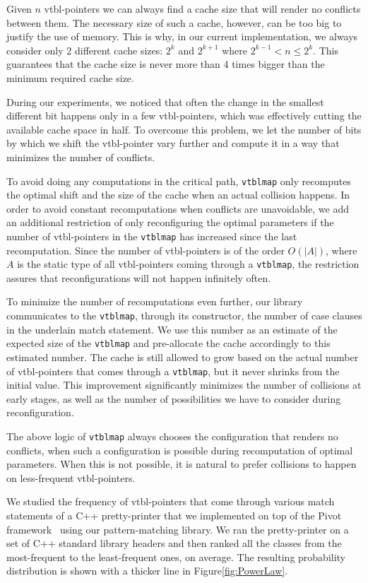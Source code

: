 \documentclass[preprint]{sigplanconf}
\makeatletter
\DeclareRobustCommand{\code}[1]{{\lstinline[breaklines=false,escapechar=@]{#1}}}
\makeatother
\begin{document}
Given $n$ vtbl-pointers we can always find a cache size that will render no 
conflicts between them. The necessary size of such a cache, however, can be too 
big to justify the use of memory. This is why, in our current implementation, we 
always consider only 2 different cache sizes: $2^k$ and $2^{k+1}$ where 
$2^{k-1} < n \leq 2^k$. This guarantees that the cache size is never more than 4 
times bigger than the minimum required cache size.

During our experiments, we noticed that often the change in the smallest 
different bit happens only in a few vtbl-pointers, which was effectively 
cutting the available cache space in half. To overcome this problem, we let the 
number of bits by which we shift the vtbl-pointer vary further and compute it in 
a way that minimizes the number of conflicts.

To avoid doing any computations in the critical path, \code{vtblmap} only 
recomputes the optimal shift and the size of the cache when an actual collision 
happens. In order to avoid constant recomputations when conflicts are unavoidable, 
we add an additional restriction of only reconfiguring the optimal parameters if 
the number of vtbl-pointers in the \code{vtblmap} has increased since the last 
recomputation. Since the number of vtbl-pointers is of the order $O(|A|)$, where 
$A$ is the static type of all vtbl-pointers coming through a \code{vtblmap}, the 
restriction assures that reconfigurations will not happen infinitely often.

To minimize the number of recomputations even further, our library communicates 
to the \code{vtblmap}, through its constructor, the number of case clauses in 
the underlain match statement. We use this number as an estimate of the expected 
size of the \code{vtblmap} and pre-allocate the cache accordingly to this estimated 
number. The cache is still allowed to grow based on the actual number of 
vtbl-pointers that comes through a \code{vtblmap}, but it never shrinks from the
initial value. This improvement significantly minimizes the number of collisions 
at early stages, as well as the number of possibilities we have to consider 
during reconfiguration.

The above logic of \code{vtblmap} always chooses the configuration that renders 
no conflicts, when such a configuration is possible during recomputation of 
optimal parameters. When this is not possible, it is natural to prefer collisions 
to happen on less-frequent vtbl-pointers.

We studied the frequency of vtbl-pointers that come through various match statements
of a C++ pretty-printer that we implemented on top of the Pivot 
framework~\cite{Pivot09} using our pattern-matching library. We ran the 
pretty-printer on a set of C++ standard library headers and then ranked all the  
classes from the most-frequent to the least-frequent ones, on average. The 
resulting probability distribution is shown with a thicker line in 
Figure\ref{fig:PowerLaw}.
\end{document}

